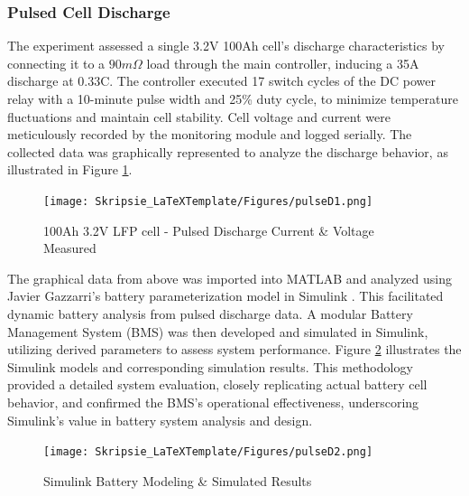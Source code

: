 \subsubsection{Pulsed Cell Discharge}\label{subsec:pulsemee}
The experiment assessed a single 3.2V 100Ah cell's discharge characteristics by connecting it to a $90m\Omega$ load through the main controller, inducing a 35A discharge at 0.33C. The controller executed 17 switch cycles of the DC power relay with a 10-minute pulse width and 25\% duty cycle, to minimize temperature fluctuations and maintain cell stability. Cell voltage and current were meticulously recorded by the monitoring module and logged serially. The collected data was graphically represented to analyze the discharge behavior, as illustrated in Figure \ref{fig:pulsess1}.
\newpage
\begin{figure}[h!]
\centering
\texttt{[image: Skripsie\_LaTeXTemplate/Figures/pulseD1.png]}
\caption{100Ah 3.2V LFP cell - Pulsed Discharge Current \& Voltage Measured}
\label{fig:pulsess1}
\end{figure}
\noindent
The graphical data from above was imported into MATLAB and analyzed using Javier Gazzarri's battery parameterization model in Simulink \cite{SIMULINKKK}. This facilitated dynamic battery analysis from pulsed discharge data. A modular Battery Management System (BMS) was then developed and simulated in Simulink, utilizing derived parameters to assess system performance. Figure \ref{fig:pulsess2} illustrates the Simulink models and corresponding simulation results. This methodology provided a detailed system evaluation, closely replicating actual battery cell behavior, and confirmed the BMS's operational effectiveness, underscoring Simulink's value in battery system analysis and design.

\begin{figure}[h!]
\centering
\texttt{[image: Skripsie\_LaTeXTemplate/Figures/pulseD2.png]}
\caption{Simulink Battery Modeling \& Simulated Results \cite{SIMULINKKK}}
\label{fig:pulsess2}
\end{figure}


\vfill